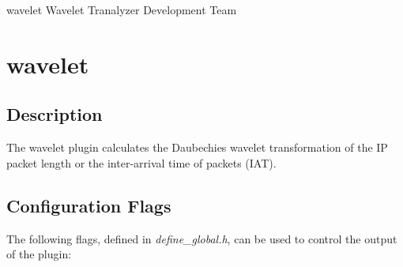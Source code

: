 \documentclass[documentation]{subfiles}
\begin{document}
\trantitle
    {wavelet} %
    {Wavelet} %
    {Tranalyzer Development Team}

\section{wavelet}\label{s:wavelet}

\subsection{Description}
The wavelet plugin calculates the Daubechies wavelet transformation of the IP packet length or the inter-arrival time of packets (IAT).

\subsection{Configuration Flags}
The following flags, defined in {\em define\_global.h}, can be used to control the output of the plugin:
\end{document}
